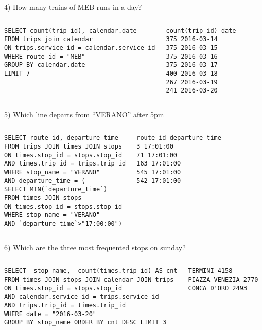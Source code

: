 \documentclass{beamer}
\begin{document}
\begin{frame}[fragile]
 4) How many trains of MEB runs in a day?
 \begin{columns}
   \begin{lstlisting}
SELECT count(trip_id), calendar.date
FROM trips join calendar
ON trips.service_id = calendar.service_id
WHERE route_id = "MEB"
GROUP BY calendar.date 
LIMIT 7
\end{lstlisting}
\small
\begin{verbatim}
count(trip_id) date
375 2016-03-14
375 2016-03-15
375 2016-03-16
375 2016-03-17
400 2016-03-18
267 2016-03-19
241 2016-03-20
\end{verbatim}
 \end{columns}
\end{frame}

\begin{frame}[fragile]
 5) Which line departs from ``VERANO'' after 5pm
 \begin{columns}
   \begin{lstlisting}
SELECT route_id, departure_time
FROM trips JOIN times JOIN stops 
ON times.stop_id = stops.stop_id 
AND times.trip_id = trips.trip_id
WHERE stop_name = "VERANO"
AND departure_time = (
SELECT MIN(`departure_time`) 
FROM times JOIN stops 
ON times.stop_id = stops.stop_id 
WHERE stop_name = "VERANO" 
AND `departure_time`>"17:00:00")
\end{lstlisting}
\small
\begin{verbatim}
route_id departure_time
3 17:01:00
71 17:01:00
163 17:01:00
545 17:01:00
542 17:01:00
\end{verbatim}
 \end{columns}
\end{frame}

\begin{frame}[fragile]
6) Which are the three most frequented stops on sunday?
 \begin{columns}
   \begin{lstlisting}
SELECT  stop_name,  count(times.trip_id) AS cnt
FROM times JOIN stops JOIN calendar JOIN trips
ON times.stop_id = stops.stop_id
AND calendar.service_id = trips.service_id
AND trips.trip_id = times.trip_id
WHERE date = "2016-03-20"
GROUP BY stop_name ORDER BY cnt DESC LIMIT 3
\end{lstlisting}
\small
\begin{verbatim}
TERMINI 4158
PIAZZA VENEZIA 2770
CONCA D'ORO 2493
\end{verbatim}
 \end{columns}
\end{frame}
\end{document}
